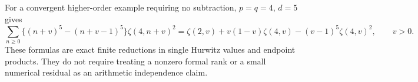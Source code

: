 For a convergent higher-order example requiring no subtraction,
$p=q=4$, $d=5$ gives
\begin{equation}\label{sh:fourthsquare}
 \sum_{n\ge0}\{(n+v)^5-(n+v-1)^5\}\zeta(4,n+v)^2
 =\zeta(2,v)+v(1-v)\zeta(4,v)
                   -(v-1)^5\zeta(4,v)^2,
 \qquad v>0.
\end{equation}
These formulas are exact finite reductions in single Hurwitz values
and endpoint products.  They do not require treating a nonzero formal
rank or a small numerical residual as an arithmetic independence claim.
